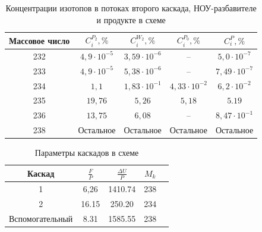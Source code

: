 \begin{table}
    \begin{tabular}{|c|c|c|c|c|}
        \hline Массовое число & $C_{i}^{P_{2}}, \%$ & $C_{i}^{W_{2}}, \%$ & $C_{i}^{P_{0}}, \%$ & $C_{i}^{P}, \%$\\
        \hline 232 & $4,9\cdot10^{-5}$ & $3,59\cdot10^{-6}$ & -- & $5,0\cdot10^{-7}$\\
        233 & $4,9\cdot10^{-5}$ & $5,38\cdot10^{-6}$ & -- & $7,49\cdot10^{-7}$\\
        234 & $1,1$ & $1,83\cdot10^{-1}$ & $4,33\cdot10^{-2}$ & $6,2\cdot10^{-2}$\\
        235 & $19,76$ & $5,26$ & $5,18$  & $5.19$\\
        236 & $13,75$ & $6,08$ & --  & $8,47\cdot10^{-1}$\\
        238 & Остальное & Остальное & Остальное  & Остальное\\
        \hline
\end{tabular}
\caption{Концентрации изотопов в потоках второго каскада, НОУ-разбавителе и продукте в схеме}\label{MDKcas2params}
\end{table}



\begin{table}
    \begin{tabular}{|c|c|c|c|c|}
        \hline Каскад & $\frac{F}{P}$ & $\frac{\Delta U}{P}$ & $M_{k}$\\
        \hline 1      &     6,26     &     1410.74       &    238   \\
               2      &     16.15    &     250.20        &    234   \\
        Вспомогательный  &   8.31    &     1585.55       &    238   \\
        \hline
    \end{tabular}
\caption{Параметры каскадов в схеме}\label{MDKcas_params}
\end{table}





